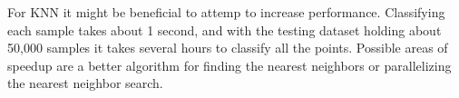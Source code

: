 \documentclass{article} %
\begin{document}
For KNN it might be beneficial to attemp to increase performance. Classifying each sample takes about 1 second, and with the testing dataset holding about 50,000 samples it takes several hours to classify all the points. Possible areas of speedup are a better algorithm for finding the nearest neighbors or parallelizing the nearest neighbor search.


\begingroup
\renewcommand{\section}[2]{}%

	
\endgroup
\end{document}
